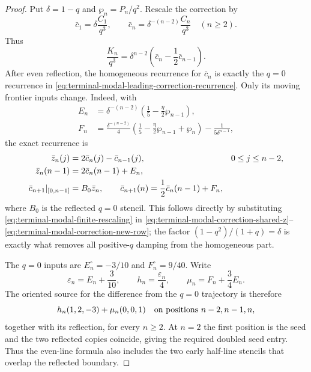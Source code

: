 \begin{proof}
Put $\delta=1-q$ and $\wp_n=P_n/q^2$.  Rescale the correction by
\begin{equation}
 \bar c_1=\delta\frac{C_1}{q^3},\qquad
 \bar c_n=\delta^{-(n-2)}\frac{C_n}{q^3}\quad(n\ge2).
 \label{eq:terminal-modal-finite-rescaling}
\end{equation}
Thus
\begin{equation}
 \frac{K_n}{q^3}=\delta^{n-2}
 \left(\bar c_n-\frac12\bar c_{n-1}\right).
 \label{eq:terminal-modal-finite-rescaled-target}
\end{equation}
After even reflection, the homogeneous recurrence for $\bar c_n$ is exactly
the $q=0$ recurrence in
\eqref{eq:terminal-modal-leading-correction-recurrence}.  Only its moving
frontier inputs change.  Indeed, with
\begin{align}
 E_n&=\delta^{-(n-2)}
 \left(\frac15-\frac\eta2\wp_{n-1}\right),
 \label{eq:terminal-modal-finite-E}\\
 F_n&=\frac{\delta^{-(n-2)}}4
 \left(\frac15-\frac\eta2\wp_{n-1}+\wp_n\right)
 -\frac1{5\delta^{n-1}},
 \label{eq:terminal-modal-finite-F}
\end{align}
the exact recurrence is
\begin{align}
 \bar z_n(j)&=2\bar c_n(j)-\bar c_{n-1}(j),&&0\le j\le n-2,\notag\\
 \bar z_n(n-1)&=2\bar c_n(n-1)+E_n,\notag\\
 \bar c_{n+1}|_{[0,n-1]}&=B_0\bar z_n,\qquad
 \bar c_{n+1}(n)=\frac12\bar c_n(n-1)+F_n,
 \label{eq:terminal-modal-finite-rescaled-recurrence}
\end{align}
where $B_0$ is the reflected $q=0$ stencil.  This follows directly by
substituting \eqref{eq:terminal-modal-finite-rescaling} in
\eqref{eq:terminal-modal-correction-shared-z}--
\eqref{eq:terminal-modal-correction-new-row}; the factor
$(1-q^2)/(1+q)=\delta$ is exactly what removes all positive-$q$ damping from
the homogeneous part.

The $q=0$ inputs are $E_n^\circ=-3/10$ and $F_n^\circ=9/40$.  Write
\begin{equation}
 \varepsilon_n=E_n+\frac3{10},\qquad h_n=\frac{\varepsilon_n}{4},
 \qquad \mu_n=F_n+\frac34E_n.
 \label{eq:terminal-modal-finite-source-split}
\end{equation}
The oriented source for the difference from the $q=0$ trajectory is
therefore
\begin{equation}
 h_n(1,2,-3)+\mu_n(0,0,1)
 \quad\hbox{on positions }n-2,n-1,n,
 \label{eq:terminal-modal-finite-source-packets}
\end{equation}
together with its reflection, for every $n\ge2$.  At $n=2$ the first
position is the seed and the two reflected copies coincide, giving the
required doubled seed entry.  Thus the even-line formula also includes the
two early half-line stencils that overlap the reflected boundary.


\end{proof}
